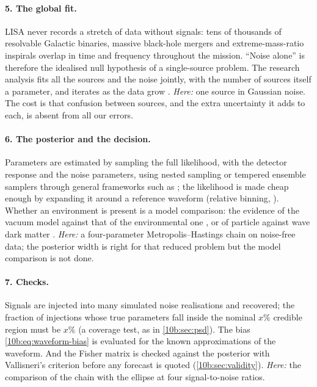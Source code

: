 \paragraph{5. The global fit.} LISA never records a stretch of data without signals: tens of thousands of resolvable
Galactic binaries, massive black-hole mergers and extreme-mass-ratio inspirals overlap in time and frequency throughout
the mission. ``Noise alone'' is therefore the idealised null hypothesis of a single-source problem. The research analysis
fits all the sources and the noise jointly, with the number of sources itself a parameter, and iterates as the data
grow \cite{LittenbergCornish2023}. \emph{Here:} one source in Gaussian noise. The cost is that confusion between sources,
and the extra uncertainty it adds to each, is absent from all our errors.

\paragraph{6. The posterior and the decision.} Parameters are estimated by sampling the full likelihood, with the
detector response and the noise parameters, using nested sampling \cite{Speagle2020} or tempered ensemble samplers
\cite{KarnesisEryn2023} through general frameworks such as  \cite{AshtonBilby2019}; the likelihood is made cheap
enough by expanding it around a reference waveform (relative binning, \cite{ZackayDaiVenumadhav2018}). Whether an
environment is present is a model comparison: the evidence of the vacuum model against that of the environmental one
\cite{Coogan2022}, or of particle against wave dark matter \cite{Kim2023}. \emph{Here:} a four-parameter
Metropolis--Hastings chain on noise-free data; the posterior width is right for that reduced problem but the model
comparison is not done.

\paragraph{7. Checks.} Signals are injected into many simulated noise realisations and recovered; the fraction of
injections whose true parameters fall inside the nominal $x\%$ credible region must be $x\%$ (a coverage test, as in
\cref{10b:sec:psd}). The bias \eqref{10b:eq:waveform-bias} is evaluated for the known approximations of the waveform. And
the Fisher matrix is checked against the posterior with Vallisneri's criterion before any forecast is quoted
(\cref{10b:sec:validity}). \emph{Here:} the comparison of the chain with the ellipse at four signal-to-noise ratios.


